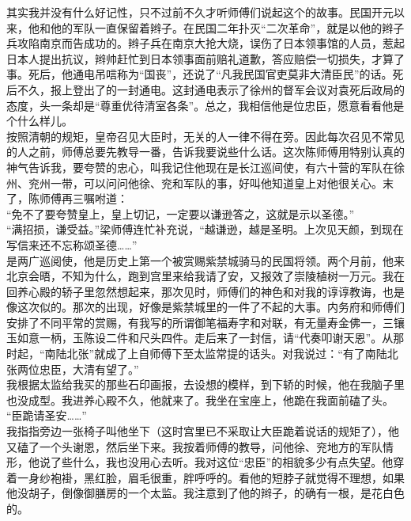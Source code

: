 其实我并没有什么好记性，只不过前不久才听师傅们说起这个的故事。民国开元以来，他和他的军队一直保留着辫子。在民国二年扑灭“二次革命”，就是以他的辫子兵攻陷南京而告成功的。辫子兵在南京大抢大烧，误伤了日本领事馆的人员，惹起日本人提出抗议，辫帅赶忙到日本领事面前赔礼道歉，答应赔偿一切损失，才算了事。死后，他通电吊唁称为“国丧”，还说了“凡我民国官吏莫非大清臣民”的话。死后不久，报上登出了的一封通电。这封通电表示了徐州的督军会议对袁死后政局的态度，头一条却是“尊重优待清室各条”。总之，我相信他是位忠臣，愿意看看他是个什么样儿。\\

按照清朝的规矩，皇帝召见大臣时，无关的人一律不得在旁。因此每次召见不常见的人之前，师傅总要先教导一番，告诉我要说些什么话。这次陈师傅用特别认真的神气告诉我，要夸赞的忠心，叫我记住他现在是长江巡间使，有六十营的军队在徐州、兖州一带，可以问问他徐、兖和军队的事，好叫他知道皇上对他很关心。末了，陈师傅再三嘱咐道：\\

“免不了要夸赞皇上，皇上切记，一定要以谦逊答之，这就是示以圣德。”\\

“满招损，谦受益。”梁师傅连忙补充说，“越谦逊，越是圣明。上次见天颜，到现在写信来还不忘称颂圣德……”\\

是两广巡阅使，他是历史上第一个被赏赐紫禁城骑马的民国将领。两个月前，他来北京会晤，不知为什么，跑到宫里来给我请了安，又报效了崇陵植树一万元。我在回养心殿的轿子里忽然想起来，那次见时，师傅们的神色和对我的谆谆教诲，也是像这次似的。那次的出现，好像是紫禁城里的一件了不起的大事。内务府和师傅们安排了不同平常的赏赐，有我写的所谓御笔福寿字和对联，有无量寿金佛一，三镶玉如意一柄，玉陈设二件和尺头四件。走后来了一封信，请“代奏叩谢天恩”。从那时起，“南陆北张”就成了上自师傅下至太监常提的话头。对我说过：“有了南陆北张两位忠臣，大清有望了。”\\

我根据太监给我买的那些石印画报，去设想的模样，到下轿的时候，他在我脑子里也没成型。我进养心殿不久，他就来了。我坐在宝座上，他跪在我面前磕了头。\\

“臣跪请圣安……”\\

我指指旁边一张椅子叫他坐下（这时宫里已不采取让大臣跪着说话的规矩了），他又磕了一个头谢恩，然后坐下来。我按着师傅的教导，问他徐、兖地方的军队情形，他说了些什么，我也没用心去听。我对这位“忠臣”的相貌多少有点失望。他穿着一身纱袍褂，黑红脸，眉毛很重，胖呼呼的。看他的短脖子就觉得不理想，如果他没胡子，倒像御膳房的一个太监。我注意到了他的辫子，的确有一根，是花白色的。\\

